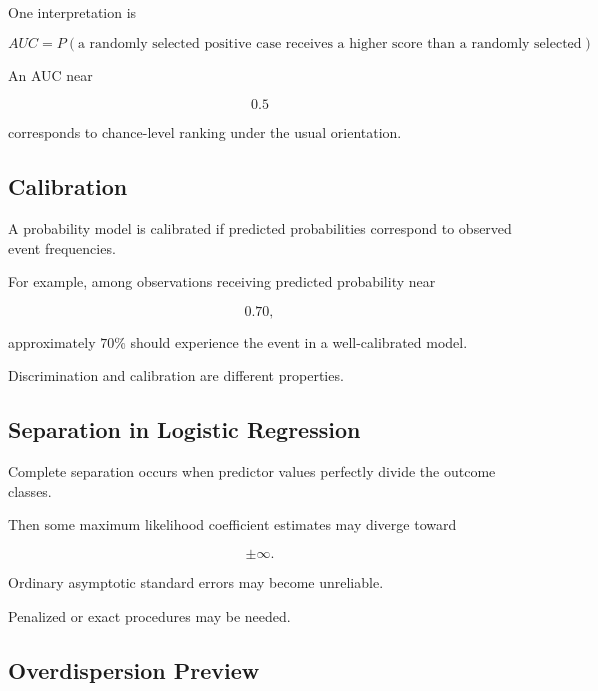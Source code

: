 One interpretation is

\[
\boxed{
AUC
=
P
(
\text{a randomly selected positive case receives a higher score than a
randomly selected negative case}
).
}
\]

An AUC near

\[
0.5
\]

corresponds to chance-level ranking under the usual orientation.

\subsection{Calibration}
\label{subsec:logistic-calibration}

A probability model is calibrated if predicted probabilities correspond
to observed event frequencies.

For example, among observations receiving predicted probability near

\[
0.70,
\]

approximately \(70\%\) should experience the event in a well-calibrated
model.

Discrimination and calibration are different properties.

\subsection{Separation in Logistic Regression}
\label{subsec:logistic-separation}

Complete separation occurs when predictor values perfectly divide the
outcome classes.

Then some maximum likelihood coefficient estimates may diverge toward

\[
\pm\infty.
\]

Ordinary asymptotic standard errors may become unreliable.

Penalized or exact procedures may be needed.

\subsection{Overdispersion Preview}
\label{subsec:binary-overdispersion}

